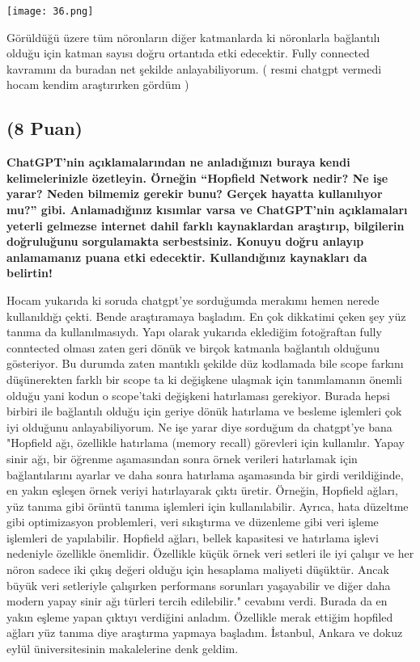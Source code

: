 \documentclass[11pt]{article}
\begin{document}
\begin{center}
    \texttt{[image: 36.png]}
\end{center}

Görüldüğü üzere tüm nöronların diğer katmanlarda ki nöronlarla bağlantılı olduğu için katman sayısı doğru ortantıda etki edecektir. Fully connected kavramını da buradan net şekilde anlayabiliyorum. ( resmi chatgpt vermedi hocam kendim araştırırken gördüm )


\subsection{(8 Puan)} \textbf{ChatGPT’nin açıklamalarından ne anladığınızı buraya kendi kelimelerinizle özetleyin. Örneğin ``Hopfield Network nedir? Ne işe yarar? Neden bilmemiz gerekir bunu? Gerçek hayatta kullanılıyor mu?'' gibi. Anlamadığınız kısımlar varsa ve ChatGPT’nin açıklamaları yeterli gelmezse internet dahil farklı kaynaklardan araştırıp, bilgilerin doğruluğunu sorgulamakta serbestsiniz. Konuyu doğru anlayıp anlamamanız puana etki edecektir. Kullandığınız kaynakları da belirtin!}

Hocam yukarıda ki soruda chatgpt'ye sorduğumda merakımı hemen nerede kullanıldığı çekti. Bende araştıramaya başladım. En çok dikkatimi çeken şey yüz tanıma da kullanılmasıydı. Yapı olarak
yukarıda eklediğim fotoğraftan fully conntected olması zaten geri dönük ve birçok katmanla bağlantılı olduğunu gösteriyor. Bu durumda zaten mantıklı şekilde düz kodlamada bile scope farkını düşünerekten farklı bir scope ta ki değişkene ulaşmak için tanımlamanın önemli olduğu yani kodun o scope'taki değişkeni hatırlaması gerekiyor. Burada hepsi birbiri ile bağlantılı olduğu için geriye dönük hatırlama
ve besleme işlemleri çok iyi olduğunu anlayabiliyorum. Ne işe yarar diye sorduğum da chatgpt'ye bana "Hopfield ağı, özellikle hatırlama (memory recall) görevleri için kullanılır. Yapay sinir ağı, bir öğrenme aşamasından sonra örnek verileri hatırlamak için bağlantılarını ayarlar ve daha sonra hatırlama aşamasında bir girdi verildiğinde, en yakın eşleşen örnek veriyi hatırlayarak çıktı üretir.
Örneğin, Hopfield ağları, yüz tanıma gibi örüntü tanıma işlemleri için kullanılabilir. Ayrıca, hata düzeltme gibi optimizasyon problemleri, veri sıkıştırma ve düzenleme gibi veri işleme işlemleri de yapılabilir.
Hopfield ağları, bellek kapasitesi ve hatırlama işlevi nedeniyle özellikle önemlidir. Özellikle küçük örnek veri setleri ile iyi çalışır ve her nöron sadece iki çıkış değeri olduğu için hesaplama maliyeti düşüktür. Ancak büyük veri setleriyle çalışırken performans sorunları yaşayabilir ve diğer daha modern yapay sinir ağı türleri tercih edilebilir." cevabını verdi. Burada da en yakın eşleme yapan çıktıyı verdiğini anladım. Özellikle merak ettiğim hopfiled ağları yüz tanıma diye araştırma yapmaya başladım. İstanbul, Ankara ve dokuz eylül üniversitesinin makalelerine denk geldim.
\end{document}
